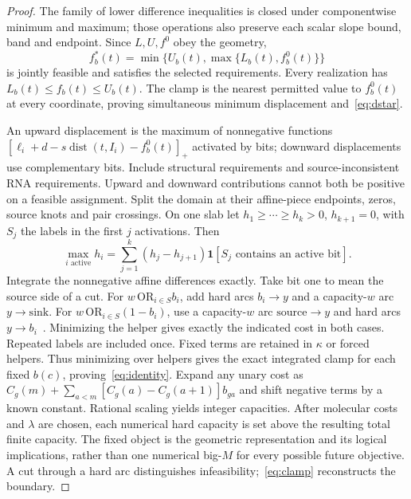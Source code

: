\documentclass[10pt,letterpaper]{article}
\newcommand{\ind}{\mathbf 1}
\newcommand{\dist}{\operatorname{dist}}
\begin{document}
\begin{proof}
The family of lower difference inequalities is closed under componentwise minimum and maximum; those operations also preserve each scalar slope bound, band and endpoint. Since $L,U,f^0$ obey the geometry,
\begin{equation}
f_b^*(t)=\min\{U_b(t),\max\{L_b(t),f_b^0(t)\}\}\label{eq:clamp}
\end{equation}
is jointly feasible and satisfies the selected requirements. Every realization has $L_b(t)\le f_b(t)\le U_b(t)$. The clamp is the nearest permitted value to $f_b^0(t)$ at every coordinate, proving simultaneous minimum displacement and~\eqref{eq:dstar}.

An upward displacement is the maximum of nonnegative functions $[\ell_i+d-s\dist(t,I_i)-f_b^0(t)]_+$ activated by bits; downward displacements use complementary bits. Include structural requirements and source-inconsistent RNA requirements. Upward and downward contributions cannot both be positive on a feasible assignment. Split the domain at their affine-piece endpoints, zeros, source knots and pair crossings. On one slab let $h_1\ge\cdots\ge h_k>0$, $h_{k+1}=0$, with $S_j$ the labels in the first $j$ activations. Then
\begin{equation}
\max_{i\text{ active}}h_i=\sum_{j=1}^k(h_j-h_{j+1})\ind[S_j\text{ contains an active bit}].\label{eq:layers}
\end{equation}
Integrate the nonnegative affine differences exactly. Take bit one to mean the source side of a cut. For $w\,\mathrm{OR}_{i\in S}b_i$, add hard arcs $b_i\to y$ and a capacity-$w$ arc $y\to\mathrm{sink}$. For $w\,\mathrm{OR}_{i\in S}(1-b_i)$, use a capacity-$w$ arc $\mathrm{source}\to y$ and hard arcs $y\to b_i$~\cite{kz,kohli}. Minimizing the helper gives exactly the indicated cost in both cases. Repeated labels are included once. Fixed terms are retained in $\kappa$ or forced helpers. Thus minimizing over helpers gives the exact integrated clamp for each fixed $b(c)$, proving~\eqref{eq:identity}. Expand any unary cost as $C_g(m)+\sum_{a<m}[C_g(a)-C_g(a+1)]b_{ga}$ and shift negative terms by a known constant. Rational scaling yields integer capacities. After molecular costs and $\lambda$ are chosen, each numerical hard capacity is set above the resulting total finite capacity. The fixed object is the geometric representation and its logical implications, rather than one numerical big-$M$ for every possible future objective. A cut through a hard arc distinguishes infeasibility;~\eqref{eq:clamp} reconstructs the boundary.
\end{proof}
\end{document}
